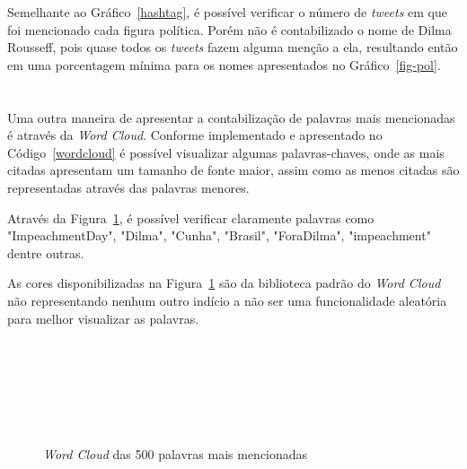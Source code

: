 Semelhante ao Gráfico~\ref{hashtag}, é possível verificar o número de \textit{tweets} em que foi mencionado cada figura política. Porém não é contabilizado o nome de Dilma Rousseff, pois quase todos os \textit{tweets} fazem alguma menção a ela, resultando então em uma porcentagem mínima para os nomes apresentados no Gráfico~\ref{fig-pol}. \\ \\ \\

Uma outra maneira de apresentar a contabilização de palavras mais mencionadas é através da \textit{Word Cloud}. Conforme implementado e apresentado no Código~\ref{wordcloud} é possível visualizar algumas palavras-chaves, onde as mais citadas apresentam um tamanho de fonte maior, assim como as menos citadas são representadas através das palavras menores.

Através da Figura~\ref{fig:wordcloud}, é possível verificar claramente palavras como "ImpeachmentDay", "Dilma", "Cunha", "Brasil", "ForaDilma", "impeachment" dentre outras.

As cores disponibilizadas na Figura~\ref{fig:wordcloud} são da biblioteca padrão do \textit{Word Cloud} não representando nenhum outro indício a não ser uma funcionalidade aleatória para melhor visualizar as palavras. \\ \\ \\ \\ \\ \\ \\

\begin{figure}[h]
	\centering
	\caption{\textit{Word Cloud} das 500 palavras mais mencionadas}
	\vspace{-0.3cm}
	\label{fig:wordcloud}
\end{figure}


